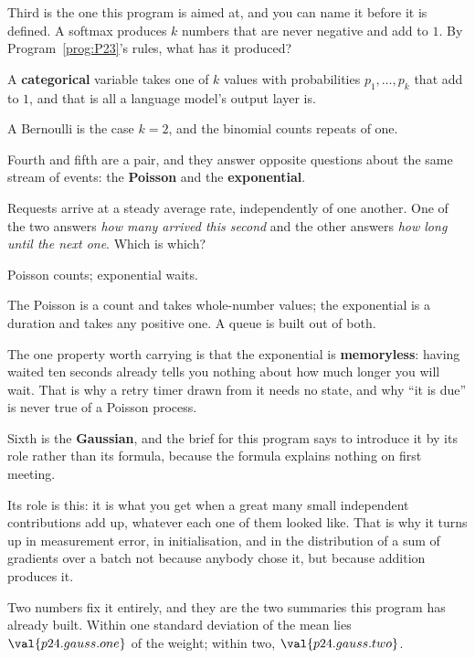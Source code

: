 \begin{fr}
Third is the one this program is aimed at, and you can name it before it is
defined. A softmax produces $k$ numbers that are never negative and add to
$1$. By Program~\ref{prog:P23}'s rules, what has it produced?
\dotline
\nextframe
\end{fr}

\begin{fr}

A \textbf{categorical} variable takes one of $k$ values with probabilities
$p_1, \ldots, p_k$ that add to $1$, and that is all a language model's output
layer is.

A Bernoulli is the case $k = 2$, and the binomial counts repeats of one.
\end{fr}

\begin{fr}
Fourth and fifth are a pair, and they answer opposite questions about the same
stream of events: the \textbf{Poisson} and the \textbf{exponential}.

Requests arrive at a steady average rate, independently of one another. One of
the two answers \emph{how many arrived this second} and the other answers
\emph{how long until the next one}. Which is which?
\dotline
\nextframe
\end{fr}

\begin{fr}
\begin{ansblock}
Poisson counts; exponential waits.
\end{ansblock}

The Poisson is a count and takes whole-number values; the exponential is a
duration and takes any positive one. A queue is built out of both.

The one property worth carrying is that the exponential is
\textbf{memoryless}: having waited ten seconds already tells you nothing about
how much longer you will wait. That is why a retry timer drawn from it needs
no state, and why \enquote{it is due} is never true of a Poisson process.
\end{fr}

\begin{fr}
Sixth is the \textbf{Gaussian}, and the brief for this program says to
introduce it by its role rather than its formula, because the formula explains
nothing on first meeting.

Its role is this: it is what you get when a great many small independent
contributions add up, whatever each one of them looked like. That is why it
turns up in measurement error, in initialisation, and in the distribution of a
sum of gradients over a batch \dash{} not because anybody chose it, but
because addition produces it.

Two numbers fix it entirely, and they are the two summaries this program has
already built. Within one standard deviation of the mean lies
$\val{p24.gauss.one}$ of the weight; within two, $\val{p24.gauss.two}$.
\end{fr}

